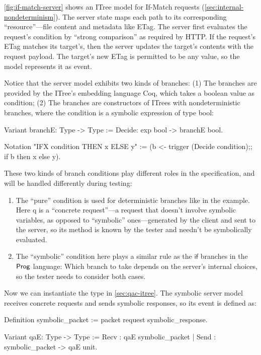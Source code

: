 \autoref{fig:if-match-server} shows an ITree model for If-Match requests 
(\autoref{sec:internal-nondeterminism}).  The server state    maps each path to its corresponding ``resource''---file content and
metadata like ETag.  The server first evaluates the request's 
condition by ``strong comparison'' as required by HTTP.  If the request's ETag
matches its target's, then the server updates the target's contents with the
request payload.  The target's new ETag  is permitted to be any value,
so the model represents it as  event.

Notice that the server model exhibits two kinds of branches: (1) The 
branches are provided by the ITree's embedding language Coq, which takes a
boolean value as condition; (2) The  branches are constructors of
ITrees with nondeterministic branches, where the condition is a symbolic
expression of type bool:
\begin{coq}
  Variant branchE: Type -> Type :=
    Decide: exp bool -> branchE bool.

  Notation "IFX condition THEN x ELSE y" :=
    (b <- trigger (Decide condition);;
     if b then x else y).
\end{coq}

These two kinds of branch conditions play different roles in the specification,
and will be handled differently during testing:
\begin{enumerate}
\item The ``pure''  condition is used for deterministic branches like
   in the example.  Here \ilc q is a ``concrete
  request''---a request that doesn't involve symbolic variables, as opposed to
  ``symbolic'' ones---generated by the client and sent to the server, so its
  method is known by the tester and needn't be symbolically evaluated.
\item The ``symbolic''  condition here plays a similar rule as the
  $\mathsf{if}$ branches in the $\mathsf{Prog}$ language: Which branch to take depends
  on the server's internal choices, so the tester needs to consider both cases.
\end{enumerate}

Now we can instantiate the  type in \autoref{sec:qac-itree}.  The
symbolic server model receives concrete requests and sends symbolic responses,
so its event is defined as:
\begin{coq}
  Definition symbolic_packet := packet request symbolic_response.

  Variant qaE: Type -> Type :=
    Recv : qaE symbolic_packet
  | Send : symbolic_packet -> qaE unit.
\end{coq}


